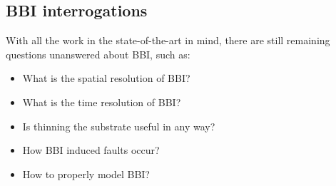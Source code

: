 	\subsection{BBI interrogations}
		With all the work in the state-of-the-art in mind, there are still remaining questions unanswered about BBI, such as:
		\begin{itemize}
			\item What is the spatial resolution of BBI?
			\item What is the time resolution of BBI?
			\item Is thinning the substrate useful in any way?
			\item How BBI induced faults occur?
			\item How to properly model BBI?
		\end{itemize}

